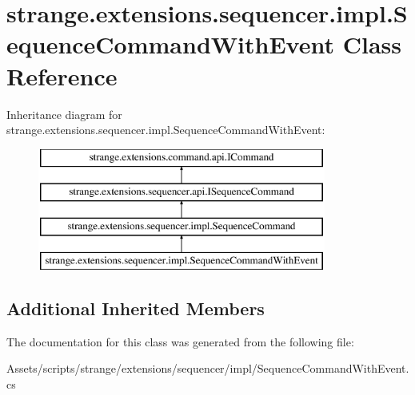 \hypertarget{classstrange_1_1extensions_1_1sequencer_1_1impl_1_1_sequence_command_with_event}{\section{strange.\-extensions.\-sequencer.\-impl.\-Sequence\-Command\-With\-Event Class Reference}
\label{classstrange_1_1extensions_1_1sequencer_1_1impl_1_1_sequence_command_with_event}
}
Inheritance diagram for strange.\-extensions.\-sequencer.\-impl.\-Sequence\-Command\-With\-Event\-:\begin{figure}[H]
\begin{center}
\leavevmode
\includegraphics[height=4.000000cm]{classstrange_1_1extensions_1_1sequencer_1_1impl_1_1_sequence_command_with_event}
\end{center}
\end{figure}
\subsection*{Additional Inherited Members}


The documentation for this class was generated from the following file\-:\begin{DoxyCompactItemize}
\item 
Assets/scripts/strange/extensions/sequencer/impl/Sequence\-Command\-With\-Event.\-cs\end{DoxyCompactItemize}
